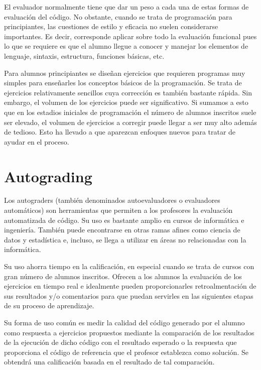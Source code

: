 El evaluador normalmente tiene que dar un peso a cada una de estas formas de evaluación del código. No obstante, cuando se trata de programación para principiantes, las cuestiones de estilo y eficacia no suelen considerarse importantes. Es decir, corresponde aplicar sobre todo la evaluación funcional pues lo que se requiere es que el alumno llegue a conocer y manejar los elementos de lenguaje, sintaxis, estructura, funciones básicas, etc.

Para alumnos principiantes se diseñan ejercicios que requieren programas muy simples para enseñarles los conceptos básicos de la programación. Se trata de ejercicios relativamente sencillos cuya corrección es también bastante rápida. Sin embargo, el volumen de los ejercicios puede ser significativo. Si sumamos a esto que en los estadios iniciales de programación el número de alumnos inscritos suele ser elevado, el volumen de ejercicios a corregir puede llegar a ser muy alto además de tedioso. Esto ha llevado a que aparezcan enfoques nuevos para tratar de ayudar en el proceso.

\section{Autograding}
Los autograders (también denominados autoevaluadores o evaluadores automáticos) son herramientas que permiten a los profesores la evaluación automatizada de código. Su uso es bastante amplio en cursos de informática e ingeniería. También puede encontrarse en otras ramas afines como ciencia de datos y estadística e, incluso, se llega a utilizar en áreas no relacionadas con la informática.

Su uso ahorra tiempo en la calificación, en especial cuando se trata de cursos con gran número de alumnos inscritos. Ofrecen a los alumnos la evaluación de los ejercicios en tiempo real e idealmente pueden proporcionarles retroalmentación de sus resultados y/o comentarios para que puedan servirles en las siguientes etapas de su proceso de aprendizaje.

Su forma de uso común es medir la calidad del código generado por el alumno como respuesta a ejercicios propuestos mediante la comparación de los resultados de la ejecución de dicho código con el resultado esperado o la respuesta que proporciona el código de referencia que el profesor establezca como solución. Se obtendrá una calificación basada en el resultado de tal comparación.

